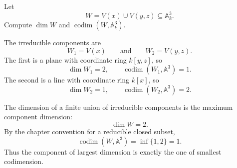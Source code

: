 \begin{problem}\label{prob:vi31-11}
Let
\[
W=V(x)\cup V(y,z)\subseteq\mathbb A^3_k.
\]
Compute \(\dim W\) and \(\operatorname{codim}(W,\mathbb A^3_k)\).
\end{problem}

\ifdefined\FullProblemDossiers
\begin{solution}
The irreducible components are
\[
W_1=V(x)
\qquad\text{and}\qquad
W_2=V(y,z).
\]
The first is a plane with coordinate ring \(k[y,z]\), so
\[
\dim W_1=2,
\qquad
\operatorname{codim}(W_1,\mathbb A^3)=1.
\]
The second is a line with coordinate ring \(k[x]\), so
\[
\dim W_2=1,
\qquad
\operatorname{codim}(W_2,\mathbb A^3)=2.
\]

The dimension of a finite union of irreducible components is the maximum component dimension:
\[
\boxed{\dim W=2}.
\]
By the chapter convention for a reducible closed subset,
\[
\operatorname{codim}(W,\mathbb A^3)
=
\inf\{1,2\}
=
\boxed{1}.
\]
Thus the component of largest dimension is exactly the one of smallest codimension.
\end{solution}
\fi
